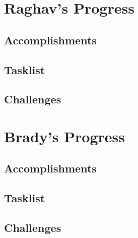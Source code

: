 \documentclass[letterpaper, twoside, draft]{article}
\begin{document}
\section{Raghav's Progress}
\subsection{Accomplishments}
\subsection{Tasklist}
\subsection{Challenges}
\section{Brady's Progress}
\subsection{Accomplishments}
\subsection{Tasklist}
\subsection{Challenges}
\end{document}
